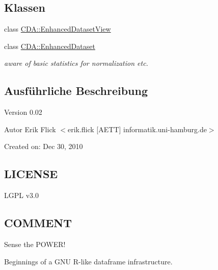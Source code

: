 \subsection*{Klassen}
\begin{DoxyCompactItemize}
\item 
class \hyperlink{classCDA_1_1EnhancedDatasetView}{CDA::EnhancedDatasetView}
\item 
class \hyperlink{classCDA_1_1EnhancedDataset}{CDA::EnhancedDataset}
\begin{DoxyCompactList}\small\item\em aware of basic statistics for normalization etc. \item\end{DoxyCompactList}\end{DoxyCompactItemize}


\subsection{Ausführliche Beschreibung}
\begin{DoxyVersion}{Version}
0.02 
\end{DoxyVersion}
\begin{DoxyAuthor}{Autor}
Erik Flick $<$erik.flick \mbox{[}AETT\mbox{]} informatik.uni-\/hamburg.de$>$
\end{DoxyAuthor}
Created on: Dec 30, 2010\hypertarget{ProbabilisticClustering_8c_09_09_LICENSE}{}\subsection{LICENSE}\label{ProbabilisticClustering_8c_09_09_LICENSE}
LGPL v3.0\hypertarget{Data_8h_09_09_COMMENT}{}\subsection{COMMENT}\label{Data_8h_09_09_COMMENT}
Sense the POWER!

Beginnings of a GNU R-\/like dataframe infrastructure. 